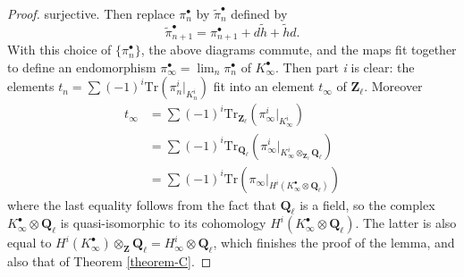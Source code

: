 \documentclass{stacks-project}
\theoremstyle{plain}
\theoremstyle{definition}
\theoremstyle{remark}
\numberwithin{equation}{subsection}
\def\lim{\mathop{\mathrm{lim}}\nolimits}
\begin{document}
\begin{proof}
surjective. Then replace $\pi_n^\bullet$ by $\tilde\pi_n^\bullet$ defined by
$$
\tilde\pi_{n+1}^\bullet = \pi_{n+1}^\bullet + d\tilde h+\tilde hd.
$$
With this choice of $\{\pi_n^\bullet\}$, the above diagrams commute, and the
maps fit together to define an endomorphism $\pi_\infty^\bullet =
\lim_n\pi_n^\bullet$ of $K_\infty^\bullet$. Then part {\it i} is clear:
the elements $t_n = \sum(-1)^i \text{Tr}\left(\pi_n^i |_{K_n^i}\right)$
fit into an element $t_\infty$ of $\mathbf{Z}_\ell$. Moreover
\begin{align*}
t_\infty
& =
\sum (-1)^i \text{Tr}_{\mathbf{Z}_\ell}(\pi_\infty^i |_{K_\infty^i}) \\
& =
\sum (-1)^i \text{Tr}_{\mathbf{Q}_\ell}(
\pi_\infty^i |_{K_\infty^i \otimes_{\mathbf{Z}_\ell}\mathbf{Q}_\ell}) \\
& =
\sum (-1)^i \text{Tr}(
\pi_\infty |_{H^i(K_\infty^\bullet \otimes \mathbf{Q}_\ell)})
\end{align*}
where the last equality follows from the fact that $\mathbf{Q}_\ell$ is a
field, so the complex $K_\infty^\bullet \otimes \mathbf{Q}_\ell$ is
quasi-isomorphic to its cohomology
$H^i(K_\infty^\bullet \otimes \mathbf{Q}_\ell)$. The latter is also equal to
$H^i(K_\infty^\bullet)\otimes_{\mathbf{Z}}\mathbf{Q}_\ell = H_\infty^i \otimes
\mathbf{Q}_\ell$, which finishes the proof of the lemma, and also that of
Theorem \ref{theorem-C}.
\end{proof}
\end{document}
